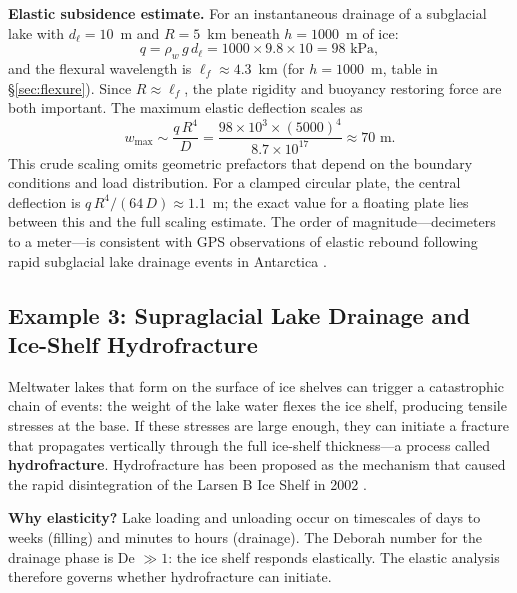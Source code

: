 \documentclass[11pt]{article}
\begin{document}
\medskip
\noindent\textbf{Elastic subsidence estimate.}  For an instantaneous drainage of a subglacial lake with $d_{\ell} = 10$~m and $R = 5$~km beneath $h = 1000$~m of ice:
\begin{equation}
  q = \rho_w\,g\,d_{\ell} = 1000 \times 9.8 \times 10 = 98 \text{ kPa},
\end{equation}
and the flexural wavelength is $\ell_f \approx 4.3$~km (for $h = 1000$~m, table in \S\ref{sec:flexure}).  Since $R \approx \ell_f$, the plate rigidity and buoyancy restoring force are both important.  The maximum elastic deflection scales as
\begin{equation}
  w_{\text{max}} \sim \frac{q\,R^4}{D} = \frac{98 \times 10^3 \times (5000)^4}{8.7 \times 10^{17}} \approx 70 \text{ m}.
  \label{eq:jokulhlaup_deflection}
\end{equation}
This crude scaling omits geometric prefactors that depend on the boundary conditions and load distribution.  For a clamped circular plate, the central deflection is $q\,R^4/(64\,D) \approx 1.1$~m; the exact value for a floating plate lies between this and the full scaling estimate.  The order of magnitude---decimeters to a meter---is consistent with GPS observations of elastic rebound following rapid subglacial lake drainage events in Antarctica \cite{Siegfriedetal2014}.

\subsection{Example 3: Supraglacial Lake Drainage and Ice-Shelf Hydrofracture}
\label{sec:example_lake}

Meltwater lakes that form on the surface of ice shelves can trigger a catastrophic chain of events: the weight of the lake water flexes the ice shelf, producing tensile stresses at the base.  If these stresses are large enough, they can initiate a fracture that propagates vertically through the full ice-shelf thickness---a process called \textbf{hydrofracture}.  Hydrofracture has been proposed as the mechanism that caused the rapid disintegration of the Larsen B Ice Shelf in 2002 \cite{ScambosHulbe2000,BanwellMacAyeal2013}.

\medskip
\noindent\textbf{Why elasticity?}  Lake loading and unloading occur on timescales of days to weeks (filling) and minutes to hours (drainage).  The Deborah number for the drainage phase is De $\gg 1$: the ice shelf responds elastically.  The elastic analysis therefore governs whether hydrofracture can initiate.
\end{document}
